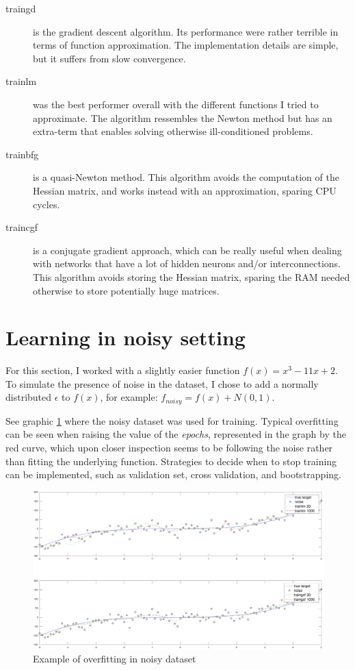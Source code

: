 \documentclass[11pt, a4paper]{article}
\begin{document}
\begin{description}
\item [traingd] is the gradient descent algorithm. Its performance
  were rather terrible in terms of function approximation. The
  implementation details are simple, but it suffers from slow
  convergence.
\item [trainlm] was the best performer overall with the different
  functions I tried to approximate. The algorithm ressembles the
  Newton method but has an extra-term that enables solving otherwise
  ill-conditioned problems.
\item [trainbfg] is a quasi-Newton method. This algorithm avoids the
  computation of the Hessian matrix, and works instead with an
  approximation, sparing CPU cycles.
\item [traincgf] is a conjugate gradient approach, which can be really
  useful when dealing with networks that have a lot of hidden neurons
  and/or interconnections. This algorithm avoids storing the Hessian
  matrix, sparing the RAM needed otherwise to store potentially huge
  matrices.
\end{description}

\section{Learning in noisy setting}

For this section, I worked with a slightly easier function
$f(x)=x^3-11x+2$. To simulate the presence of noise in the dataset, I
chose to add a normally distributed $\epsilon$ to $f(x)$, for example:
$f_{noisy}=f(x)+N(0,1)$.

See graphic \ref{fig:trainnoise} where the noisy dataset was used for
training. Typical overfitting can be seen when raising the value of
the \emph{epochs}, represented in the graph by the red curve, which
upon closer inspection seems to be following the noise rather than
fitting the underlying function. Strategies to decide when to stop
training can be implemented, such as validation set, cross validation,
and bootstrapping.

\begin{figure}[H]
  \includegraphics[scale=.43]{trainnoise.pdf}
  \caption{Example of overfitting in noisy dataset}  
  \label{fig:trainnoise}
\end{figure}

{\footnotesize
 
}
\end{document}
